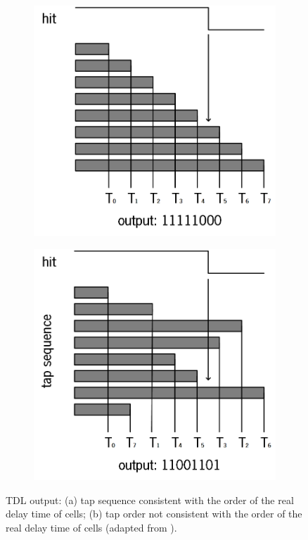 \begin{figure}[ht!]
	\centering
	\begin{subfigure}[b]{.35\textwidth}
		\centering
		\includegraphics[width=\linewidth]{img/02_StateofArt/no_bubble.png}
		\caption{}
		\label{fig:no_bubble}
	\end{subfigure}
	\begin{subfigure}[b]{.35\textwidth}
		\centering
		\includegraphics[width=\linewidth]{img/02_StateofArt/bubble.png}
		\caption{}
		\label{fig:bubble}
	\end{subfigure}
	\caption{TDL output: (a) tap sequence consistent with the order of the real delay time of cells; (b) tap order not consistent with the order of the real delay time of cells (adapted from \citep{count_ones}).}
	\label{fig:bubble_diagram}
\end{figure}


